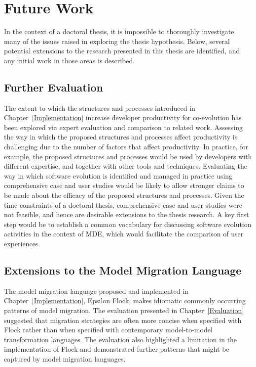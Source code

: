 
\section{Future Work}
\label{sec:future_work}
In the context of a doctoral thesis, it is impossible to thoroughly investigate many of the issues raised in exploring the thesis hypothesis. Below, several potential extensions to the research presented in this thesis are identified, and any initial work in those areas is described. 

\subsection{Further Evaluation}
The extent to which the structures and processes introduced in Chapter~\ref{Implementation} increase developer productivity for co-evolution has been explored via expert evaluation and comparison to related work. Assessing the way in which the proposed structures and processes affect productivity is challenging due to the number of factors that affect productivity. In practice, for example, the proposed structures and processes would be used by developers with different expertise, and together with other tools and techniques. Evaluating the way in which software evolution is identified and managed in practice using comprehensive case and user studies would be likely to allow stronger claims to be made about the efficacy of the proposed structures and processes. Given the time constraints of a doctoral thesis, comprehensive case and user studies were not feasible, and hence are desirable extensions to the thesis research. A key first step would be to establish a common vocabulary for discussing software evolution activities in the context of MDE, which would facilitate the comparison of user experiences.

\subsection{Extensions to the Model Migration Language}
The model migration language proposed and implemented in Chapter~\ref{Implementation}, Epsilon Flock, makes idiomatic commonly occurring patterns of model migration. The evaluation presented in Chapter~\ref{Evaluation} suggested that migration strategies are often more concise when specified with Flock rather than when specified with contemporary model-to-model transformation languages. The evaluation also highlighted a limitation in the implementation of Flock and demonstrated further patterns that might be captured by model migration languages.


